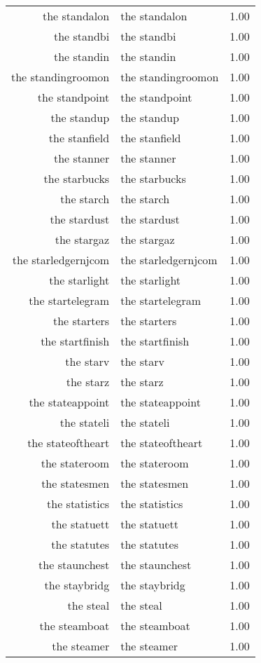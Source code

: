 \begin{table}[ht]
\begin{tabular}{rlr}
  the standalon & the standalon & 1.00 \\ 
  the standbi & the standbi & 1.00 \\ 
  the standin & the standin & 1.00 \\ 
  the standingroomon & the standingroomon & 1.00 \\ 
  the standpoint & the standpoint & 1.00 \\ 
  the standup & the standup & 1.00 \\ 
  the stanfield & the stanfield & 1.00 \\ 
  the stanner & the stanner & 1.00 \\ 
  the starbucks & the starbucks & 1.00 \\ 
  the starch & the starch & 1.00 \\ 
  the stardust & the stardust & 1.00 \\ 
  the stargaz & the stargaz & 1.00 \\ 
  the starledgernjcom & the starledgernjcom & 1.00 \\ 
  the starlight & the starlight & 1.00 \\ 
  the startelegram & the startelegram & 1.00 \\ 
  the starters & the starters & 1.00 \\ 
  the startfinish & the startfinish & 1.00 \\ 
  the starv & the starv & 1.00 \\ 
  the starz & the starz & 1.00 \\ 
  the stateappoint & the stateappoint & 1.00 \\ 
  the stateli & the stateli & 1.00 \\ 
  the stateoftheart & the stateoftheart & 1.00 \\ 
  the stateroom & the stateroom & 1.00 \\ 
  the statesmen & the statesmen & 1.00 \\ 
  the statistics & the statistics & 1.00 \\ 
  the statuett & the statuett & 1.00 \\ 
  the statutes & the statutes & 1.00 \\ 
  the staunchest & the staunchest & 1.00 \\ 
  the staybridg & the staybridg & 1.00 \\ 
  the steal & the steal & 1.00 \\ 
  the steamboat & the steamboat & 1.00 \\ 
  the steamer & the steamer & 1.00 \\ 

\end{tabular}
\end{table}
